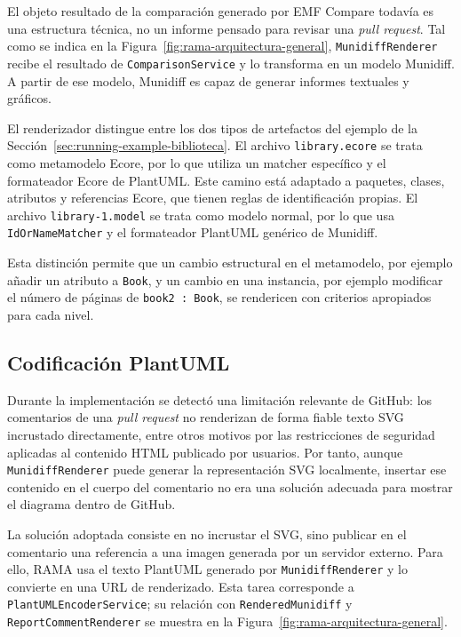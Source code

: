 \documentclass[11pt]{article}
\begin{document}
El objeto resultado de la comparación generado por EMF Compare todavía es una estructura técnica, no un informe pensado para revisar una \textit{pull request}. Tal como se indica en la Figura~\ref{fig:rama-arquitectura-general}, \texttt{MunidiffRenderer} recibe el resultado de \texttt{ComparisonService} y lo transforma en un modelo Munidiff. A partir de ese modelo, Munidiff es capaz de generar informes textuales y gráficos.

El renderizador distingue entre los dos tipos de artefactos del ejemplo de la Sección~\ref{sec:running-example-biblioteca}. El archivo \texttt{library.ecore} se trata como metamodelo Ecore, por lo que utiliza un matcher específico y el formateador Ecore de PlantUML. Este camino está adaptado a paquetes, clases, atributos y referencias Ecore, que tienen reglas de identificación propias. El archivo \texttt{library-1.model} se trata como modelo normal, por lo que usa \texttt{IdOrNameMatcher} y el formateador PlantUML genérico de Munidiff.

Esta distinción permite que un cambio estructural en el metamodelo, por ejemplo añadir un atributo a \texttt{Book}, y un cambio en una instancia, por ejemplo modificar el número de páginas de \texttt{book2 : Book}, se rendericen con criterios apropiados para cada nivel.

\subsection{Codificación PlantUML}
\label{sec:plantuml-encoding}

Durante la implementación se detectó una limitación relevante de GitHub: los comentarios de una \textit{pull request} no renderizan de forma fiable texto SVG incrustado directamente, entre otros motivos por las restricciones de seguridad aplicadas al contenido HTML publicado por usuarios. Por tanto, aunque \texttt{MunidiffRenderer} puede generar la representación SVG localmente, insertar ese contenido en el cuerpo del comentario no era una solución adecuada para mostrar el diagrama dentro de GitHub.

La solución adoptada consiste en no incrustar el SVG, sino publicar en el comentario una referencia a una imagen generada por un servidor externo. Para ello, RAMA usa el texto PlantUML generado por \texttt{MunidiffRenderer} y lo convierte en una URL de renderizado. Esta tarea corresponde a \texttt{PlantUMLEncoderService}; su relación con \texttt{RenderedMunidiff} y \texttt{ReportCommentRenderer} se muestra en la Figura~\ref{fig:rama-arquitectura-general}.
\end{document}
